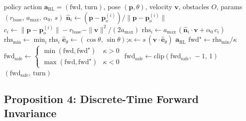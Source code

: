 \documentclass[letterpaper]{article}
\begin{document}
\begin{algorithm}[t]
\caption{VA-ATACOM safety filter (Component~1)}
\label{alg:dtatacom}
\begin{algorithmic}[1]
\REQUIRE policy action $\boldsymbol{a}_\text{RL}=(\text{fwd},\,\text{turn})$, pose $(\boldsymbol{p},\theta)$, velocity $\boldsymbol{v}$, obstacles $O$, params $(r_\text{base},\,a_{\max},\,\alpha_0,\,s)$
    \STATE $\hat{\boldsymbol{n}}_i \gets (\boldsymbol{p}-\boldsymbol{p}_o^{(i)})/\|\boldsymbol{p}-\boldsymbol{p}_o^{(i)}\|$
    \STATE $c_i \gets \|\boldsymbol{p}-\boldsymbol{p}_o^{(i)}\| - r_\text{base} - \|\boldsymbol{v}\|^2/(2a_{\max})$ 
    \STATE $\text{rhs}_i \gets a_{\max}\,(\hat{\boldsymbol{n}}_i\!\cdot\!\boldsymbol{v} + \alpha_0\, c_i)$ 
\ENDFOR
\STATE $\text{rhs}_{\min} \gets \min_i \text{rhs}_i$ 
\STATE $\hat{\boldsymbol{e}}_\theta \gets (\cos\theta,\,\sin\theta)$;\quad $\kappa \gets s\,(\boldsymbol{v}\!\cdot\!\hat{\boldsymbol{e}}_\theta)$ 
    \STATE \RETURN $\boldsymbol{a}_\text{RL}$ 
\ENDIF
\STATE $\text{fwd}^\star \gets \text{rhs}_{\min}/\kappa$ 
\STATE $\text{fwd}_\text{safe} \gets
        \begin{cases}\min(\text{fwd},\text{fwd}^\star) & \kappa>0\\[-2pt]
                     \max(\text{fwd},\text{fwd}^\star) & \kappa<0\end{cases}$
\STATE $\text{fwd}_\text{safe} \gets \text{clip}(\text{fwd}_\text{safe},\,-1,\,1)$
\RETURN $(\text{fwd}_\text{safe},\,\text{turn})$ 
\end{algorithmic}
\end{algorithm}

\subsection{Proposition 4: Discrete-Time Forward Invariance}
\label{sec:prop4}
\end{document}
